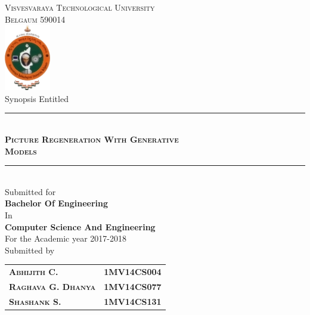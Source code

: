 

\begin{titlepage} %
	\newcommand{\HRule}{\rule{\linewidth}{0.5mm}} %

	\center %

	\textsc{\LARGE Visvesvaraya Technological University\\[3pt]Belgaum 590014}\\[10pt] 
	\includegraphics[width=0.15\textwidth]{images/vtu.png}\\[10pt] 

	{\Large Synopsis Entitled}\\[10pt] %


	\HRule\\[10pt]
	\textsc{\huge \textbf{Picture Regeneration With Generative}\\[3pt] \textbf{Models}}\\[10pt]

	\HRule\\[10pt]
	\Large{
		Submitted for\\
		\textbf{Bachelor Of Engineering}\\
		In \\
		\textbf{Computer Science And Engineering} \\
		For the Academic year 2017-2018 
	}\\[15pt]
	\Large{Submitted by}\\[2pt]
	\begin{tabular}{ l r }
		\textsc{\Large \textbf{Abhijith C.}}       & \Large \textbf{1MV14CS004} \\
		\textsc{\Large \textbf{Raghava G. Dhanya}} & \Large \textbf{1MV14CS077} \\
		\textsc{\Large \textbf{Shashank S.}}       & \Large \textbf{1MV14CS131}
	\end{tabular}\\[15pt]


\end{titlepage}
